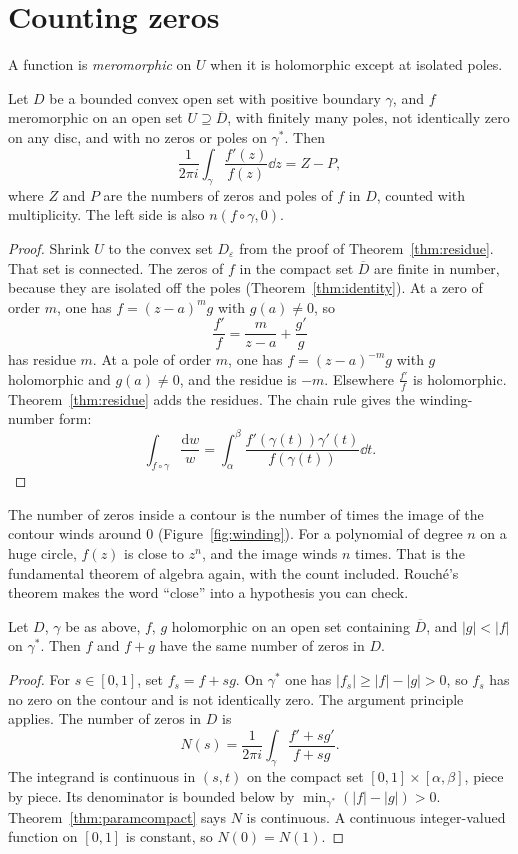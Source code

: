 \section{Counting zeros}\label{sec:argument}

A function is \emph{meromorphic} on $U$ when it is holomorphic except at isolated poles.

\begin{theorem}\label{thm:argument}
Let $D$ be a bounded convex open set with positive boundary $\gamma$, and $f$ meromorphic on an open set $U\supseteq\overline D$, with finitely many poles,
not identically zero on any disc, and with no zeros or poles on $\gamma^*$. Then
\[
\frac1{2\pi i}\int_\gamma\frac{f'(z)}{f(z)}\dd z=Z-P,
\]
where $Z$ and $P$ are the numbers of zeros and poles of $f$ in $D$, counted with multiplicity. The left side is also $n(f\circ\gamma,0)$.
\end{theorem}
\begin{proof}
Shrink $U$ to the convex set $D_\varepsilon$ from the proof of Theorem~\ref{thm:residue}. That set is connected. The zeros of $f$ in the compact set $\overline D$ are finite in number, because they are isolated off the poles (Theorem~\ref{thm:identity}). At a zero of order $m$, one has $f=(z-a)^mg$ with $g(a)\ne0$, so
\[
\frac{f'}f=\frac m{z-a}+\frac{g'}g
\]
has residue $m$. At a pole of order $m$, one has $f=(z-a)^{-m}g$ with $g$ holomorphic and $g(a)\ne0$, and the residue is $-m$. Elsewhere $\frac{f'}f$ is holomorphic. Theorem~\ref{thm:residue} adds the residues. The chain rule gives the winding-number form:
\[
\int_{f\circ\gamma}\frac{\mathrm dw}w=\int_\alpha^\beta\frac{f'(\gamma(t))\gamma'(t)}{f(\gamma(t))}\dd t.
\]
\end{proof}

The number of zeros inside a contour is the number of times the image of the contour winds around $0$ (Figure~\ref{fig:winding}). For a polynomial of degree $n$ on a huge circle, $f(z)$ is close to $z^n$, and the image winds $n$ times. That is the fundamental theorem of algebra again, with the count included. Rouch\'e's theorem makes the word ``close'' into a hypothesis you can check.

\begin{theorem}[Rouch\'e]\label{thm:rouche}
Let $D$, $\gamma$ be as above, $f$, $g$ holomorphic on an open set containing $\overline D$, and $|g|<|f|$ on $\gamma^*$. Then $f$ and $f+g$ have the same
number of zeros in $D$.
\end{theorem}
\begin{proof}
For $s\in[0,1]$, set $f_s=f+sg$. On $\gamma^*$ one has $|f_s|\ge|f|-|g|>0$, so $f_s$ has no zero on the contour and is not identically zero. The argument principle applies. The number of zeros in $D$ is
\[
N(s)=\frac1{2\pi i}\int_\gamma\frac{f'+sg'}{f+sg}.
\]
The integrand is continuous in $(s,t)$ on the compact set $[0,1]\times[\alpha,\beta]$, piece by piece. Its denominator is bounded below by $\min_{\gamma^*}(|f|-|g|)>0$. Theorem~\ref{thm:paramcompact} says $N$ is continuous. A continuous integer-valued function on $[0,1]$ is constant, so $N(0)=N(1)$.
\end{proof}

